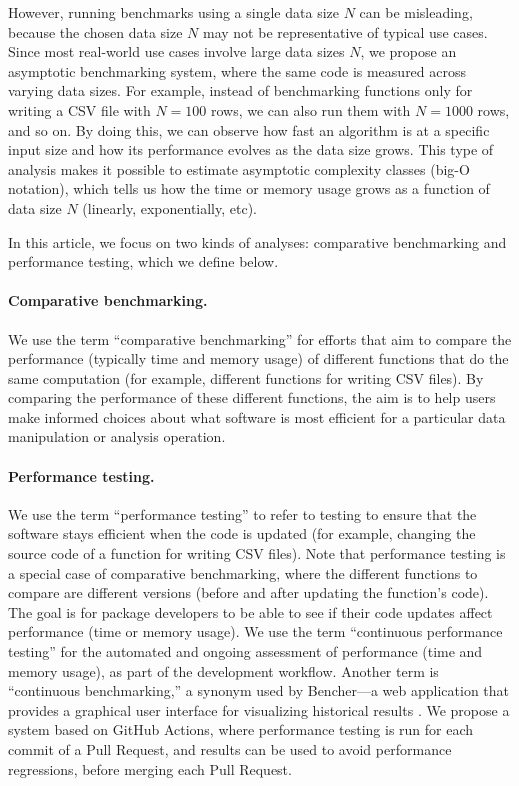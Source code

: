 However, running benchmarks using a single data size $N$ can be misleading, because the chosen data size $N$ may not be representative of typical use cases.
Since most real-world use cases involve large data sizes $N$, we propose an asymptotic benchmarking system, where the same code is measured across varying data sizes. 
For example, instead of benchmarking functions only for writing a CSV file with $N = 100$ rows, we can also run them with $N = 1000$ rows, and so on. 
By doing this, we can observe how fast an algorithm is at a specific input size and how its performance evolves as the data size grows. 
This type of analysis makes it possible to estimate asymptotic complexity classes (big-O notation), which tells us how the time or memory usage grows as a function of data size $N$ (linearly, exponentially, etc).


In this article, we focus on two kinds of analyses: comparative benchmarking and performance testing, which we define below.
\paragraph{Comparative benchmarking.}
We use the term ``comparative benchmarking'' for efforts that aim to compare the performance (typically time and memory usage) of different functions that do the same computation (for example, different functions for writing CSV files).
By comparing the performance of these different functions, the aim is to help users make informed choices about what software is most efficient for a particular data manipulation or analysis operation.
\paragraph{Performance testing.}
We use the term ``performance testing'' to refer to testing to ensure that the software stays efficient when the code is updated (for example, changing the source code of a function for writing CSV files). 
Note that performance testing is a special case of comparative benchmarking, where the different functions to compare are different versions (before and after updating the function's code). 
The goal is for package developers to be able to see if their code updates affect performance (time or memory usage).
We use the term ``continuous performance testing'' for the automated and ongoing assessment of performance (time and memory usage), as part of the development workflow. 
Another term is ``continuous benchmarking,'' a synonym used by Bencher---a web application that provides a graphical user interface for visualizing historical results \citep{bencher}.
We propose a system based on GitHub Actions, where performance testing is run for each commit of a Pull Request, and results can be used to avoid performance regressions, before merging each Pull Request.

